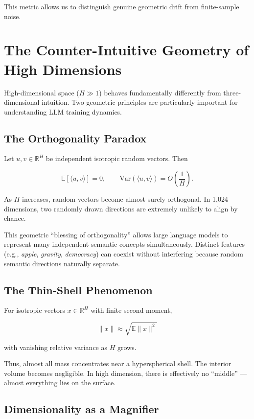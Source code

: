 This metric allows us to distinguish genuine geometric drift from
finite-sample noise.

\section{The Counter-Intuitive Geometry of High Dimensions}

High-dimensional space ($H \gg 1$) behaves fundamentally differently from
three-dimensional intuition. Two geometric principles are particularly
important for understanding LLM training dynamics.

\subsection{The Orthogonality Paradox}

Let $u, v \in \mathbb{R}^H$ be independent isotropic random vectors.
Then

\[
\mathbb{E}[\langle u, v \rangle] = 0,
\qquad
\mathrm{Var}(\langle u, v \rangle) = O\!\left(\frac{1}{H}\right).
\]

As $H$ increases, random vectors become almost surely orthogonal.
In 1,024 dimensions, two randomly drawn directions are extremely unlikely
to align by chance.

This geometric ``blessing of orthogonality'' allows large language models
to represent many independent semantic concepts simultaneously.
Distinct features (e.g., \textit{apple}, \textit{gravity}, \textit{democracy})
can coexist without interfering because random semantic directions naturally
separate.

\subsection{The Thin-Shell Phenomenon}

For isotropic vectors $x \in \mathbb{R}^H$ with finite second moment,

\[
\|x\| \approx \sqrt{\mathbb{E}\|x\|^2}
\]

with vanishing relative variance as $H$ grows.

Thus, almost all mass concentrates near a hyperspherical shell.
The interior volume becomes negligible.
In high dimension, there is effectively no ``middle'' —
almost everything lies on the surface.

\subsection{Dimensionality as a Magnifier}

